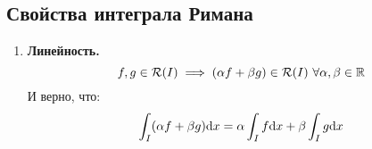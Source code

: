\documentclass[a4paper]{article}
\begin{document}
\subsection{Свойства интеграла Римана}

\begin{enumerate}
    \item {\textbf{Линейность.}
    \begin{equation*}
        f, g \in \mathcal{R}(I) \implies (\alpha f + \beta g)\in \mathcal{R}(I)\ \forall \alpha, \beta \in \R
    \end{equation*}
    И верно, что:
    \begin{equation*}
            \int_I(\alpha f + \beta g)\text{d}x = \alpha\int_I f\text{d}x + \beta\int_Ig\text{d}x
    \end{equation*}

\proof 

}
\end{enumerate}
\end{document}
